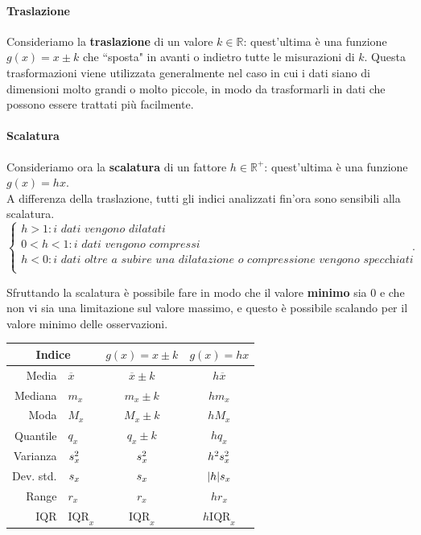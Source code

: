 \paragraph{Traslazione}
Consideriamo la \textbf{traslazione} di un valore $k \in \mathbb{R}$: quest'ultima è una funzione $g(x) = x \pm k$ che ``sposta" in avanti o indietro tutte le misurazioni di $k$. Questa trasformazioni viene utilizzata generalmente nel caso in cui i dati siano di dimensioni molto grandi o molto piccole, in modo da trasformarli in dati che possono essere trattati più facilmente.

\paragraph{Scalatura}
Consideriamo ora la \textbf{scalatura} di un fattore $h \in \mathbb{R^+}$: quest'ultima è una funzione $g(x) = hx$. \\
A differenza della traslazione, tutti gli indici analizzati fin'ora sono sensibili alla scalatura.
\[
\begin{cases}
h > 1:  \textit{i dati vengono dilatati} \\
0 < h < 1:  \textit{i dati vengono compressi} \\
h < 0:  \textit{i dati oltre a subire una dilatazione o compressione vengono specchiati} \\
\end{cases} \! \! \! \! \! \! .
\]

Sfruttando la scalatura è possibile fare in modo che il valore \textbf{minimo} sia $0$ e che non vi sia una limitazione sul valore massimo, e questo è possibile scalando per il valore minimo delle osservazioni.

\begin{table}[h]
\centering
\vspace{\abovedisplayskip}
\begin{tabular}{r l|cc}
    \multicolumn{2}{c}{\textbf{Indice}} \vline & $g(x) = x \pm k$ & $g(x) = hx$ \\
    \hline
    Media & $\overline x$ & $\overline x \pm k$ & $h \overline x$ \\
    Mediana & $m_x$ & $m_x \pm k$ & $h m_x$ \\
    Moda & $M_x$ & $M_x \pm k$ & $h M_x$ \\
    Quantile & $q_x$ & $q_x \pm k$ & $h q_x$ \\
    \hline
    Varianza & $\mathnormal{s}_x^2$ & $\mathnormal{s}_x^2$ & $h^2 \mathnormal{s}^2_x$ \\
    Dev. std. & $\mathnormal{s}_x$ & $\mathnormal{s}_x$ & $|h|\mathnormal{s}_x$ \\
    Range & $r_x$ & $r_x$ & $hr_x$ \\
    IQR & $\text{IQR}_x$ & $\text{IQR}_x$ & $h \text{IQR}_x$
\end{tabular}
\vspace{\abovedisplayskip}
\end{table}

